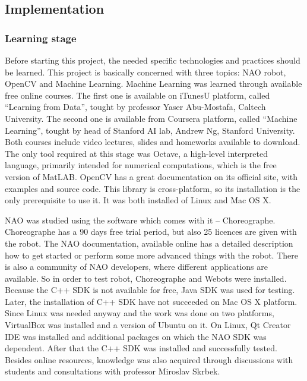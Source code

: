 







\subsection{Implementation}
    \subsubsection{Learning stage}
        Before starting this project, the needed specific technologies and practices should be learned. This project is basically concerned with three topics: NAO robot, OpenCV and Machine Learning. Machine Learning was learned through available free online courses. The first one is available on iTunesU platform, called ``Learning from Data'', tought by professor Yaser Abu-Mostafa, Caltech University. The second one is available from Coursera platform, called ``Machine Learning'', tought by head of Stanford AI lab, Andrew Ng, Stanford University. Both courses include video lectures, slides and homeworks available to download. The only tool required at this stage was Octave, a high-level interpreted language, primarily intended for numerical computations, which is the free version of MatLAB. OpenCV has a great documentation on its official site, with examples and source code. This library is cross-platform, so its installation is the only prerequisite to use it. It was both installed of Linux and Mac OS X.

         NAO was studied using the software which comes with it -- Choreographe. Choreographe has a 90 days free trial period, but also 25 licences are given with the robot. The NAO documentation, available online has a detailed description how to get started or perform some more advanced things with the robot. There is also a community of NAO developers, where different applications are available. So in order to test robot, Choreographe and Webots were installed. Because the C++ SDK is not available for free, Java SDK was used for testing. Later, the installation of C++ SDK have not succeeded on Mac OS X platform. Since Linux was needed anyway and the work was done on two platforms, VirtualBox was installed and a version of Ubuntu on it. On Linux, Qt Creator IDE was installed and additional packages on which the NAO SDK was dependent. After that the C++ SDK was installed and successfully tested. Besides online resources, knowledge was also acquired through discussions with students and consultations with professor Miroslav Skrbek. 

